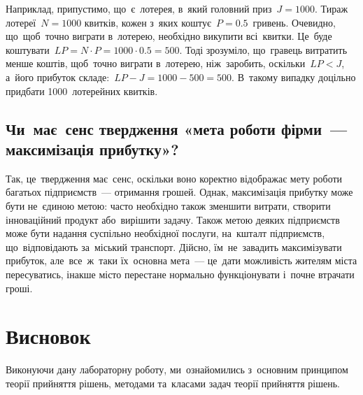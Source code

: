 \documentclass[
  a4paper,
  oneside,
  BCOR = 10mm,
  DIV = 12,
  12pt,
  headings = normal,
]{scrartcl}
\begin{document}
      Наприклад, припустимо, що~є~лотерея, в~який головний приз~$J = 1000$. Тираж лотереї~$N = 1000$ квитків, кожен з~яких коштує~$P = \num{0,5}$~гривень. Очевидно, що~щоб~точно виграти в~лотерею, необхідно викупити всі~квитки. Це~буде коштувати~$LP = N \cdot P = 1000 \cdot \num{0,5} = 500$. Тоді зрозуміло, що~гравець витратить менше коштів, щоб~точно виграти в~лотерею, ніж~заробить, оскільки~$LP < J$, а~його прибуток складе:~$LP - J = 1000 - 500 = 500$. В~такому випадку доцільно придбати 1000~лотерейних квитків.

    \subsection{Чи~має~сенс твердження «мета роботи фірми~— максимізація прибутку»?}

      Так, це~твердження має~сенс, оскільки воно коректно відображає мету роботи багатьох підприємств~— отримання грошей. Однак, максимізація прибутку може бути не~єдиною метою: часто необхідно також зменшити витрати, створити інноваційний продукт або~вирішити задачу. Також метою деяких підприємств може бути надання суспільно необхідної послуги, на~кшталт підприємств, що~відповідають за~міський транспорт. Дійсно, їм~не~завадить максимізувати прибуток, але~все~ж~таки їх~основна мета~— це~дати можливість жителям міста пересуватись, інакше місто перестане нормально функціонувати і~почне втрачати гроші.

  \section{Висновок}
    Виконуючи дану лабораторну роботу, ми~ознайомились з~основним принципом теорії прийняття рішень, методами та~класами задач теорії прийняття рішень.
\end{document}
